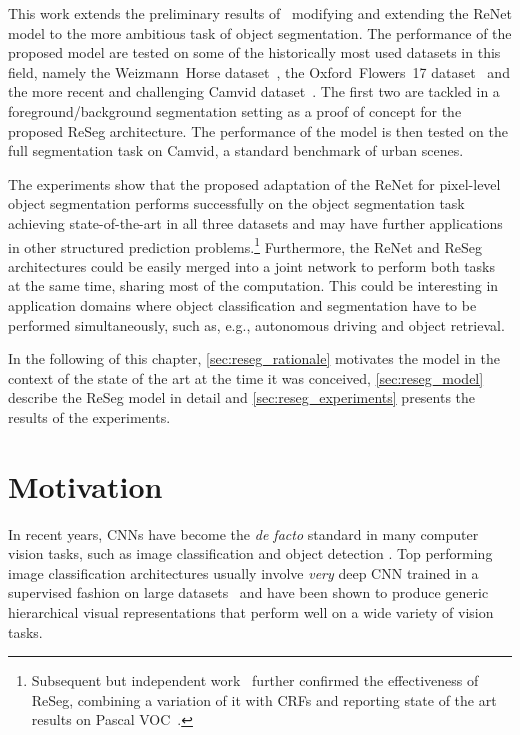 This work extends the preliminary results of~\citep{visin2015renet} modifying
and extending the ReNet model to the more ambitious task of object
segmentation. The performance of the proposed model are tested on some of the
historically most used datasets in this field, namely the Weizmann~Horse
dataset~\citep{Borenstein04combiningtop-down}, the Oxford~Flowers~17
dataset~\citep{Nilsback06} and the more recent and challenging Camvid
dataset~\citep{Brostow2010semantic,BrostowECCV08}. The first two are
tackled in a foreground/background segmentation setting as a proof of concept
for the proposed ReSeg architecture. The performance of the model is then
tested on the full segmentation task on Camvid, a standard benchmark of urban
scenes.

The experiments show that the proposed adaptation of the ReNet for pixel-level
object segmentation performs successfully on the object segmentation task
achieving state-of-the-art in all three datasets and may have further
applications in other structured prediction problems.\footnote{
    Subsequent but independent work~\citep{DBLP:journals/corr/YanZJBY16}
    further confirmed the effectiveness of ReSeg, combining a variation of it
    with CRFs and reporting state of the art results on Pascal
    VOC~\citep{Everingham15}.}
Furthermore, the ReNet and ReSeg architectures could be easily merged into a
joint network to perform both tasks at the same time, sharing most of the
computation. This could be interesting in application domains where object
classification and segmentation have to be performed simultaneously, such as,
e.g., autonomous driving and object retrieval.

In the following of this chapter, \autoref{sec:reseg_rationale} motivates the
model in the context of the state of the art at the time it was conceived,
\autoref{sec:reseg_model} describe the ReSeg model in detail and
\autoref{sec:reseg_experiments} presents the results of the experiments.


\section{Motivation}\label{sec:reseg_rationale}

In recent years, CNNs have become the {\em de facto} standard in many computer
vision tasks, such as image classification and object detection
\citep{Krizhevsky-2012,Erhan2014}. Top performing image classification
architectures usually involve {\em very} deep CNN trained in a supervised
fashion on large datasets~\citep{Lin2014,Simonyan2015, szegedy2014going} and
have been shown to produce generic hierarchical visual representations that
perform well on a wide variety of vision tasks.

